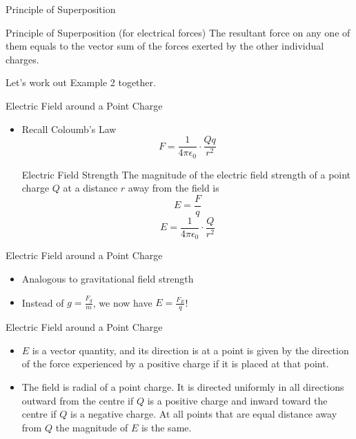 \documentclass{beamer}
\begin{document}
\begin{frame}{Principle of Superposition}
\begin{block}{Principle of Superposition (for electrical forces)}
The resultant force on any one of them equals to the vector sum of the forces exerted by the other individual charges.
\end{block}

Let's work out Example 2 together.
\end{frame}

\begin{frame}{Electric Field around a Point Charge}{}
  \begin{itemize}
  \item Recall Coloumb's Law
\[F=\frac{1}{4\pi \epsilon_0} \cdot \frac{Qq}{r^2} \]
\begin{block}{Electric Field Strength}
The magnitude of the electric field strength of a point charge \(Q\) at a distance \(r\) away from the field is
\[E=\frac{F}{q}\]
\[E=\frac{1}{4\pi \epsilon_0} \cdot \frac{Q}{r^2}\]
\end{block}
  \end{itemize}
\end{frame}

\begin{frame}{Electric Field around a Point Charge}{}
  \begin{itemize}
  \item Analogous to gravitational field strength
  \item Instead of \(g=\frac{F_g}{m}\), we now have \(E=\frac{F_E}{q}\)!
  \end{itemize}
\end{frame}

\begin{frame}{Electric Field around a Point Charge}{}
  \begin{itemize}
  \item \(E\) is a vector quantity, and its direction is at a point is given by the direction of the force experienced by a positive charge if it is placed at that point.
  \item The field is radial of a point charge. It is directed uniformly in all directions outward from the centre if \(Q\) is a positive charge and inward toward the centre if \(Q\) is a negative charge. At all points that are equal distance away from \(Q\) the magnitude of \(E\) is the same.
  \end{itemize}
\end{frame}
\end{document}
